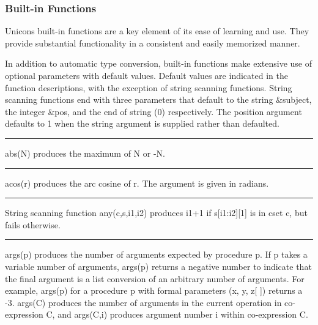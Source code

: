 \subsubsection{Built-in Functions}

Unicon{\textquotesingle}s built-in functions
are a key element of its ease of learning and use. They provide
substantial functionality in a consistent and easily memorized manner.

In addition to automatic type conversion, built-in functions make
extensive use of optional parameters with default values. Default
values are indicated in the function descriptions, with the exception
of string scanning functions. String scanning functions end with three parameters that
default to the string \textsf{\&subject}, the integer \textsf{\&pos},
and the end of string (0) respectively. The position argument defaults
to 1 when the string argument is supplied rather than defaulted.

\bigskip

\hrule\vspace{0.1cm}

\noindent {}\textsf{abs(N)} produces the maximum of
\textsf{N} or \textsf{{}-N}.

\bigskip

\hrule\vspace{0.1cm}

\noindent
{}\textsf{acos(r)} produces the arc cosine of
\textsf{r}. The argument is given in radians.

\bigskip

\hrule\vspace{0.1cm}

\noindent
{}String scanning function
\textsf{any(c,s,i1,i2)} produces \textsf{i1+1} if \textsf{s[i1:i2][1]}
is in cset \textsf{c}, but fails otherwise.

\bigskip

\hrule\vspace{0.1cm}

\noindent
{}\textsf{args(p)} produces the number of arguments
expected by procedure \textsf{p}. If \textsf{p} takes a variable number
of arguments, \textsf{args(p)} returns a negative number to indicate
that the final argument is a list conversion of an arbitrary number of
arguments. For example, \textsf{args(p)} for a procedure \textsf{p}
with formal parameters \textsf{(x, y, z[ ])} returns a \textsf{{}-3}.
\textsf{args(C)} produces the number of arguments in the current
operation in co-expression \textsf{C}, and \textsf{args(C,i)} produces
argument number \textsf{i} within co-expression \textsf{C}.

